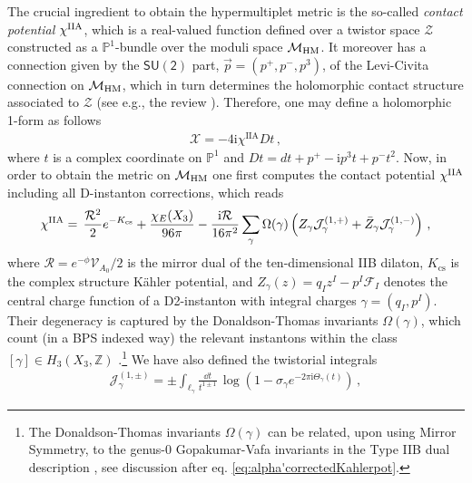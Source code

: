 The crucial ingredient to obtain the hypermultiplet metric is the so-called \emph{contact potential} $\chi^{\rm IIA}$, which is a real-valued function defined over a twistor space $\mathcal{Z}$ constructed as a $\mathbb{P}^1$-bundle over the moduli space $\mathcal{M}_{\rm HM}$. It moreover has a connection given by the $\mathsf{SU(2)}$ part, $\vec{p}=\left( p^+, p^-, p^3\right)$, of the Levi-Civita connection on $\mathcal{M}_{\rm HM}$, which in turn determines the holomorphic contact structure associated to $\mathcal{Z}$ (see e.g., the review \cite{Alexandrov:2011va}). Therefore, one may define a holomorphic 1-form as follows
%
\begin{align}\label{eq:holomorphic1form}
	\mathcal{X}=-4 \text{i} \chi^{\text{IIA}} Dt\, ,
\end{align}
%
where $t$ is a complex coordinate on $\mathbb{P}^1$ and $Dt= d t +p^+-\text{i} p^3t+p^- t^2$. Now, in order to obtain the metric on $\mathcal{M}_{\rm HM}$ one first computes the contact potential $\chi^{\rm IIA}$ including all D-instanton corrections, which reads \cite{Alexandrov:2009zh}
%
\begin{align}\label{eq:chiIIAtwistor}
	\chi^{\rm IIA} =\, \frac{\mathcal{R}^2}{2} e^{-K_{\text{cs}}} + \frac{\chi_{E}(X_3)}{96\pi} -\frac{\text{i} \mathcal{R}}{16 \pi^2} \sum_{\gamma} \Omega(\gamma) \left( Z_{\gamma} \mathcal{J}_{\gamma}^{(1, +)} + \bar{Z}_{\gamma} \mathcal{J}_{\gamma}^{(1, -)}\right)\, ,
\end{align}
%
where $\mathcal{R}=e^{-\phi} \mathcal{V}_{A_0}/2$ is the mirror dual of the ten-dimensional IIB dilaton, $K_{\text{cs}}$ is the complex structure K\"ahler potential, and $Z_{\gamma}(z)=q_I z^I-p^I \mathcal{F}_I$ denotes the central charge function of a D2-instanton with integral charges $\gamma=\left( q_I, p^I\right)$. Their degeneracy is captured by the Donaldson-Thomas invariants $\Omega(\gamma)$, which count (in a BPS indexed way) the relevant instantons within the class $[\gamma] \in H_3(X_3, \mathbb{Z})$ \cite{Alexandrov:2013yva}.\footnote{The Donaldson-Thomas invariants $\Omega(\gamma)$ can be related, upon using Mirror Symmetry, to the genus-0 Gopakumar-Vafa invariants in the Type IIB dual description \cite{Gopakumar:1998ii, Gopakumar:1998jq}, see discussion after eq. \eqref{eq:alpha'correctedKahlerpot}.} We have also defined the twistorial integrals \cite{Alexandrov:2014sya}
%
\begin{align}\label{eq:Jintegral}
	\mathcal{J}_{\gamma}^{(1, \pm)}= \pm \int_{\ell_{\gamma}} \frac{\dd t}{t^{1 \pm 1}}\, \log \left( 1-\sigma_{\gamma} e^{-2\pi \text{i} \Theta_{\gamma}(t)}\right)\, ,
\end{align}

